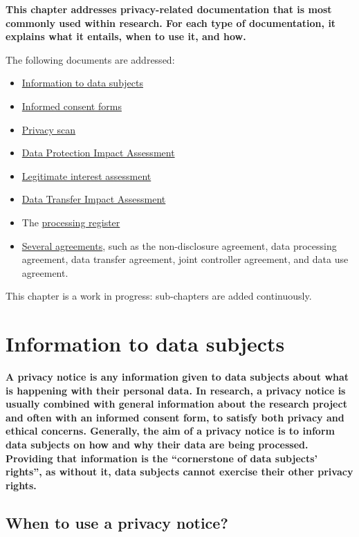 \documentclass[
]{book}
\providecommand{\tightlist}{%
  \setlength{\itemsep}{0pt}\setlength{\parskip}{0pt}}
\begin{document}
\textbf{This chapter addresses privacy-related documentation that is most commonly used
within research. For each type of documentation, it explains what it entails,
when to use it, and how.}

The following documents are addressed:

\begin{itemize}
\tightlist
\item
  \protect\hyperlink{privacy-notices}{Information to data subjects}
\item
  \protect\hyperlink{informed-consent-forms}{Informed consent forms}
\item
  \protect\hyperlink{privacy-scan}{Privacy scan}
\item
  \protect\hyperlink{dpia}{Data Protection Impact Assessment}
\item
  \protect\hyperlink{legitimate-interest-assessment}{Legitimate interest assessment}
\item
  \protect\hyperlink{dtia}{Data Transfer Impact Assessment}
\item
  The \protect\hyperlink{processing-register}{processing register}
\item
  \protect\hyperlink{agreements}{Several agreements}, such as the non-disclosure agreement, data processing
  agreement, data transfer agreement, joint controller agreement, and data use
  agreement.
\end{itemize}

This chapter is a work in progress: sub-chapters are added continuously.

\hypertarget{privacy-notices}{%
\section{Information to data subjects}\label{privacy-notices}}

\textbf{A privacy notice is any information given to data subjects about what is
happening with their personal data. In research, a privacy notice is usually
combined with general information about the research project and often with an
informed consent form, to satisfy both privacy and ethical concerns. Generally,
the aim of a privacy notice is to inform data subjects on how and why their
data are being processed. Providing that information is the ``cornerstone of
data subjects' rights'', as without it, data subjects cannot exercise their other
privacy rights.}

\hypertarget{when-to-use-a-privacy-notice}{%
\subsection{When to use a privacy notice?}\label{when-to-use-a-privacy-notice}}
\end{document}
